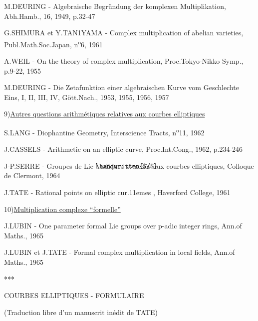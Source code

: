 M.DEURING - Algebraische Begründung der komplexen Multiplikation, Abh.Hamb., 16, 1949, p.32-47

\reversemarginpar
{}
G.SHIMURA et Y.TAN1YAMA - Complex multiplication of abelian varieties, Publ.Math.Soc.Japan, n\textsuperscript{o}6, 1961

A.WEIL - On the theory of complex multiplication, Proc.Tokyo-Nikko Symp., p.9-22, 1955

M.DEURING - Die Zetafunktion einer algebraischen Kurve vom Geschlechte Eins, I, II, III, IV, Gött.Nach., 1953, 1955, 1956, 1957

9)\quad \uline{Autres questions arithmétiques relatives aux courbes elliptiques}

S.LANG - Diophantine Geometry, Interscience Tracts, n\textsuperscript{o}11, 1962

J.CASSELS - Arithmetic on an elliptic curve, Proc.Int.Cong., 1962, p.234-246

J-P.SERRE - Groupes de Lie $\mathord{\rlap{\handwritten{$/$}}\mathrm{l}}$-adiques attachés aux courbes elliptiques, Colloque de Clermont, 1964

J.TATE - Rational points on elliptic cur\makebox[0pt][l]{\deleted{:}}\kern.11emes , Haverford College, 1961

10)\quad \uline{Multiplication complexe ``formelle''}

J.LUBIN - One parameter formal Lie groups over $\mathrm{p}$-adic integer rings, Ann.of Maths., 1965

J.LUBIN et J.TATE - Formal complex multiplication in local fields, Ann.of Maths., 1965

\begin{center}
***
\end{center}
\normalmarginpar

\begin{center}
COURBES ELLIPTIQUES - FORMULAIRE

(Traduction libre d'un manuscrit inédit de TATE)
\end{center}


